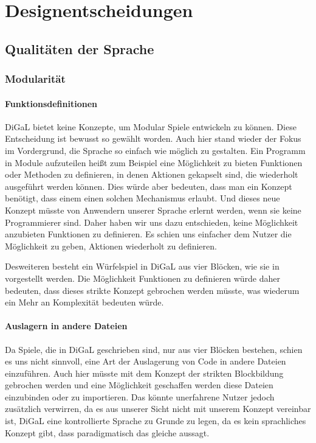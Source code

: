 
\chapter{Designentscheidungen}
\label{cha:designentscheidungen}

\section{Qualitäten der Sprache} %
\label{sec:qualitaten_der_sprache}


\subsection{Modularität} %
\label{sub:modularitat}
\subsubsection{Funktionsdefinitionen}
\label{subsub:funktionsdefinitionen}
	DiGaL bietet keine Konzepte, um Modular Spiele entwickeln zu können. Diese Entscheidung ist bewusst so gewählt worden. Auch hier stand wieder der Fokus im Vordergrund, die Sprache so einfach wie möglich zu gestalten. Ein Programm in Module aufzuteilen heißt zum Beispiel eine Möglichkeit zu bieten Funktionen oder Methoden zu definieren, in denen Aktionen gekapselt sind, die wiederholt ausgeführt werden können. Dies würde aber bedeuten, dass man ein Konzept benötigt, dass einem einen solchen Mechanismus erlaubt. Und dieses neue Konzept müsste von Anwendern unserer Sprache erlernt werden, wenn sie keine Programmierer sind. Daher haben wir uns dazu entschieden, keine Möglichkeit anzubieten Funktionen zu definieren. Es schien uns einfacher dem Nutzer die Möglichkeit zu geben, Aktionen wiederholt zu definieren.

	Desweiteren besteht ein Würfelspiel in DiGaL aus vier Blöcken, wie sie in  vorgestellt werden. Die Möglichkeit Funktionen zu definieren würde daher bedeuten, dass dieses strikte Konzept gebrochen werden müsste, was wiederum ein Mehr an Komplexität bedeuten würde.
\subsubsection{Auslagern in andere Dateien}
\label{subsub:auslagern_in_andere_dateien}
	Da Spiele, die in DiGaL geschrieben sind, nur aus vier Blöcken bestehen, schien es uns nicht sinnvoll, eine Art der Auslagerung von Code in andere Dateien einzuführen. Auch hier müsste mit dem Konzept der strikten Blockbildung gebrochen werden und eine Möglichkeit geschaffen werden diese Dateien einzubinden oder zu importieren. Das könnte unerfahrene Nutzer jedoch zusätzlich verwirren, da es aus unserer Sicht nicht mit unserem Konzept vereinbar ist, DiGaL eine kontrollierte Sprache zu Grunde zu legen, da es kein sprachliches Konzept gibt, dass paradigmatisch das gleiche aussagt.
